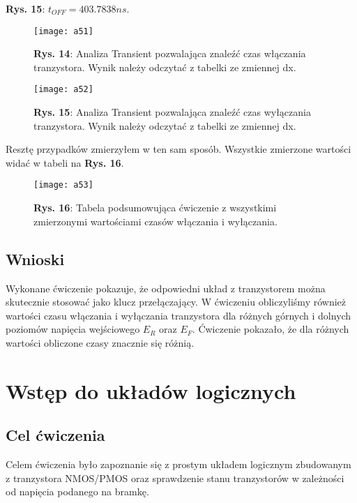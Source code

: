 \documentclass[11pt]{article}
\begin{document}
\textbf{Rys. 15}: $t_{OFF} = 403.7838ns$. 
\begin{figure}[H]
\centering
\texttt{[image: a51]}
\caption*{\textbf{Rys. 14}: Analiza Transient pozwalająca znaleźć czas włączania tranzystora. Wynik należy odczytać z tabelki ze zmiennej dx. }
\end{figure}
\begin{figure}[H]
\centering
\texttt{[image: a52]}
\caption*{\textbf{Rys. 15}: Analiza Transient pozwalająca znaleźć czas wyłączania tranzystora. Wynik należy odczytać z tabelki ze zmiennej dx. }
\end{figure}
\noindent Resztę przypadków zmierzyłem w ten sam sposób. Wszystkie zmierzone wartości widać w tabeli na \textbf{Rys. 16}.
\begin{figure}[H]
\centering
\texttt{[image: a53]}
\caption*{\textbf{Rys. 16}: Tabela podsumowująca ćwiczenie z wszystkimi zmierzonymi wartościami czasów włączania i wyłączania. }
\end{figure}
\subsection{Wnioski}
Wykonane ćwiczenie pokazuje, że odpowiedni układ z tranzystorem można skutecznie stosować jako klucz przełączający. W ćwiczeniu obliczyliśmy również wartości czasu włączania i wyłączania tranzystora dla różnych górnych i dolnych poziomów napięcia wejściowego $E_R$ oraz $E_F$. Ćwiczenie pokazało, że dla różnych wartości obliczone czasy znacznie się różnią.
\section{Wstęp do układów logicznych}
\subsection{Cel ćwiczenia}
Celem ćwiczenia było zapoznanie się z prostym układem logicznym zbudowanym z tranzystora NMOS/PMOS oraz sprawdzenie stanu tranzystorów w zależności od napięcia podanego na bramkę.
\end{document}
